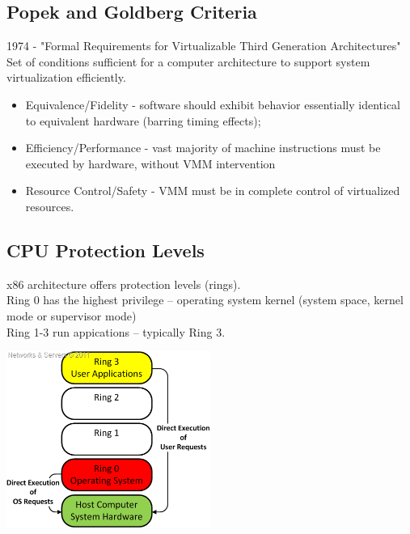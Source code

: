 \documentclass{beamer}
\begin{document}
\subsection{Popek and Goldberg Criteria}
\begin{frame}
1974 - "Formal Requirements for Virtualizable Third Generation Architectures" 
\\ \pause
Set of conditions sufficient for a computer architecture to support system virtualization efficiently. \\
\begin{itemize}
\item Equivalence/Fidelity - software should exhibit behavior essentially identical to equivalent hardware (barring timing effects);
\pause
\item Efficiency/Performance - vast majority of machine instructions must be executed by hardware, without VMM intervention
\pause
\item Resource Control/Safety - VMM must be in complete control of virtualized resources.
\end{itemize}
\end{frame}


\subsection{CPU Protection Levels}
\begin{frame}
x86 architecture offers protection levels (rings). \\
\pause
Ring 0 has the highest privilege -- operating system kernel (system space, kernel mode or supervisor mode) \\
\pause
Ring 1-3 run appications -- typically Ring 3.
\pause
\begin{center}
\includegraphics[width=0.5\textwidth]{images/ring0.png}
\end{center}
\end{frame}
\end{document}
